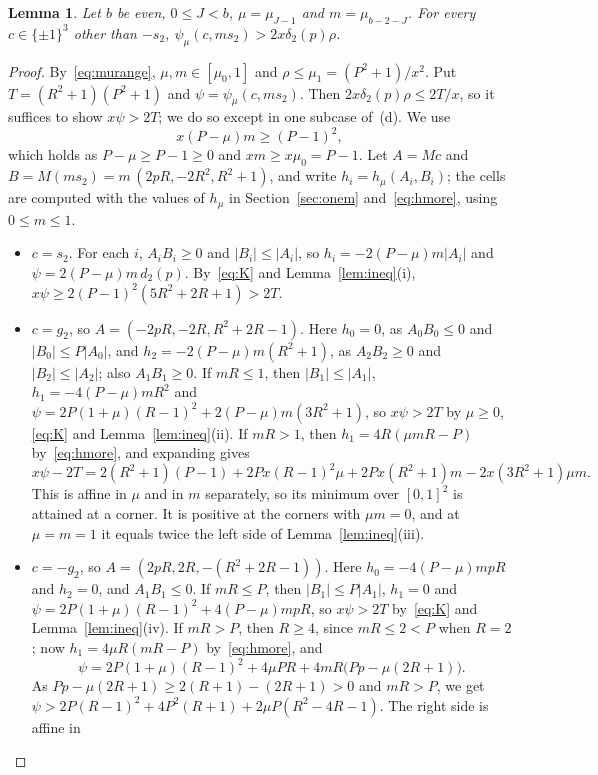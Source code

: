 \documentclass[11pt]{article}
\newtheorem{lemma}[theorem]{Lemma}
\theoremstyle{remark}
\begin{document}
\begin{lemma}\label{lem:fd1}
Let $b$ be even, $0\le J<b$, $\mu=\mu_{J-1}$ and $m=\mu_{b-2-J}$. For every
$c\in\{\pm1\}^3$ other than $-s_2$, $\psi_\mu(c,ms_2)>2x\delta_2(p)\rho$.
\end{lemma}
\begin{proof}
By~\eqref{eq:murange}, $\mu,m\in[\mu_0,1]$ and $\rho\le\mu_1=(P^2+1)/x^2$.
Put $T=(R^2+1)(P^2+1)$ and $\psi=\psi_\mu(c,ms_2)$. Then
$2x\delta_2(p)\rho\le2T/x$, so it suffices to show $x\psi>2T$; we do so
except in one subcase of~(d). We use
\begin{equation}\label{eq:K}
x(P-\mu)m\ge(P-1)^2,
\end{equation}
which holds as $P-\mu\ge P-1\ge0$ and $xm\ge x\mu_0=P-1$. Let $A=Mc$ and
$B=M(ms_2)=m\,(2pR,-2R^2,R^2+1)$, and write $h_i=h_\mu(A_i,B_i)$; the cells
are computed with the values of $h_\mu$ in Section~\ref{sec:onem}
and~\eqref{eq:hmore}, using $0\le m\le1$.
\begin{itemize}
\item[(a)] $c=s_2$. For each $i$, $A_iB_i\ge0$ and $|B_i|\le|A_i|$, so
 $h_i=-2(P-\mu)m|A_i|$ and $\psi=2(P-\mu)m\,d_2(p)$. By~\eqref{eq:K} and
 Lemma~\ref{lem:ineq}(i), $x\psi\ge2(P-1)^2(5R^2+2R+1)>2T$.
\item[(b)] $c=g_2$, so $A=(-2pR,-2R,R^2+2R-1)$. Here $h_0=0$, as
 $A_0B_0\le0$ and $|B_0|\le P|A_0|$, and $h_2=-2(P-\mu)m(R^2+1)$, as
 $A_2B_2\ge0$ and $|B_2|\le|A_2|$; also $A_1B_1\ge0$. If $mR\le1$, then
 $|B_1|\le|A_1|$, $h_1=-4(P-\mu)mR^2$ and
 $\psi=2P(1+\mu)(R-1)^2+2(P-\mu)m(3R^2+1)$, so $x\psi>2T$ by $\mu\ge0$,
 \eqref{eq:K} and Lemma~\ref{lem:ineq}(ii). If $mR>1$, then
 $h_1=4R(\mu mR-P)$ by~\eqref{eq:hmore}, and expanding gives
 \[
 x\psi-2T=2(R^2+1)(P-1)+2Px(R-1)^2\mu+2Px(R^2+1)m-2x(3R^2+1)\mu m.
 \]
 This is affine in $\mu$ and in $m$ separately, so its minimum over
 $[0,1]^2$ is attained at a corner. It is positive at the corners with
 $\mu m=0$, and at $\mu=m=1$ it equals twice the left side of
 Lemma~\ref{lem:ineq}(iii).
\item[(c)] $c=-g_2$, so $A=(2pR,2R,-(R^2+2R-1))$. Here
 $h_0=-4(P-\mu)mpR$ and $h_2=0$, and $A_1B_1\le0$. If $mR\le P$, then
 $|B_1|\le P|A_1|$, $h_1=0$ and $\psi=2P(1+\mu)(R-1)^2+4(P-\mu)mpR$, so
 $x\psi>2T$ by~\eqref{eq:K} and Lemma~\ref{lem:ineq}(iv). If $mR>P$, then
 $R\ge4$, since $mR\le2<P$ when $R=2$; now $h_1=4\mu R(mR-P)$
 by~\eqref{eq:hmore}, and
 \[
 \psi=2P(1+\mu)(R-1)^2+4\mu PR+4mR\bigl(Pp-\mu(2R+1)\bigr).
 \]
 As $Pp-\mu(2R+1)\ge2(R+1)-(2R+1)>0$ and $mR>P$, we get
 $\psi>2P(R-1)^2+4P^2(R+1)+2\mu P(R^2-4R-1)$. The right side is affine in

\end{itemize}
\end{proof}
\end{document}
